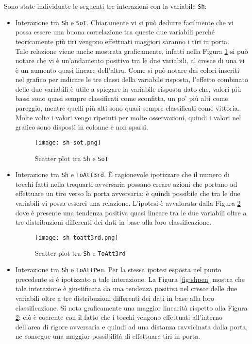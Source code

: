 \bigskip
Sono state individuate le seguenti tre interazioni con la variabile \texttt{Sh}:
\begin{itemize}
	\item Interazione tra \texttt{Sh} e \texttt{SoT}. Chiaramente vi si può dedurre facilmente che vi possa essere una buona correlazione tra queste due variabili perché teoricamente più tiri vengono effettuati maggiori saranno i tiri in porta. \\
	Tale relazione viene anche mostrata graficamente, infatti nella Figura \ref{fig:ShSoT} si può notare che vi è un'andamento positivo tra le due variabili, al cresce di una vi è un aumento quasi lineare dell'altra.
	Come si può notare dai colori inseriti nel grafico per indicare le tre classi della variabile risposta, l'effetto combinato delle due variabili è utile a spiegare la variabile risposta dato che, valori più bassi sono quasi sempre classificati come sconfitta, un po' più alti come pareggio, mentre quelli più alti sono quasi sempre classificati come vittoria.
	Molte volte i valori vengo ripetuti per molte osservazioni, quindi i valori nel grafico sono disposti in colonne e non sparsi.
	\begin{figure}[htbp]
		\begin{center}
			\texttt{[image: sh-sot.png]}
			\caption{Scatter plot tra \texttt{Sh} e \texttt{SoT}} \label{fig:ShSoT}
		\end{center}
	\end{figure} 
	\item Interazione tra \texttt{Sh} e \texttt{ToAtt3rd}. È ragionevole ipotizzare che il numero di tocchi fatti nella trequarti avversaria possano creare azioni che portano ad effettuare un tiro verso la porta avversaria; è quindi possibile che tra le due variabili vi possa esserci una relazione. L'ipotesi è avvalorata dalla Figura \ref{fig:shtreq} dove è presente una tendenza positiva quasi lineare tra le due variabili oltre a tre distribuzioni differenti dei dati in base alla loro classificazione.
	\begin{figure}[htbp]
		\begin{center}
			\texttt{[image: sh-toatt3rd.png]}
			\caption{Scatter plot tra \texttt{Sh} e \texttt{ToAtt3rd}} \label{fig:shtreq}
		\end{center}
	\end{figure}
	\item Interazione tra \texttt{Sh} e \texttt{ToAttPen}. Per la stessa ipotesi esposta nel punto precedente si è ipotizzato a tale interazione. La Figura \ref{fig:shpen} mostra che tale interazione è giustificata da una tendenza positiva nel cresce delle due variabili oltre a tre distribuzioni differenti dei dati in base alla loro classificazione. Si nota graficamente una maggior linearità rispetto alla Figura \ref{fig:shtreq}; ciò è coerente con il fatto che i tocchi vengono effettuati all'interno dell'area di rigore avversaria e quindi ad una distanza ravvicinata dalla porta, ne consegue una maggior possibilità di effettuare tiri in porta.

\end{itemize}
